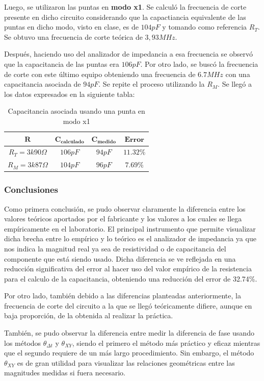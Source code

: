 \documentclass[11pt, a4paper]{article}
\begin{document}
Luego, se utilizaron las puntas en \textbf{modo x1}. Se calculó la frecuencia de corte presente en dicho circuito considerando que la capactiancia equivalente de las puntas en dicho modo, visto en clase, es de $104pF$ y tomando como referencia $R_T$. Se obtuvo una frecuencia de corte teórica de $3,93MHz$. \par Después, haciendo uso del analizador de impedancia a esa frecuencia se observó que la capacitancia de las puntas era $106pF$. Por otro lado, se buscó la frecuencia de corte con este último equipo obteniendo una frecuencia de $6.7MHz$ con una capacitancia asociada de $94pF$. Se repite el proceso utilizando la $R_M$. Se llegó a los datos expresados en la siguiente tabla:
 \begin{center}
     \begin{table}[ht]
     \centering
	 \renewcommand{\arraystretch}{1.1}
         \begin{tabular}{ c c c c}
            \hline 
             $\bm{R}$ &  $\bm{C_{calculado}}$ &    $\bm{C_{medido}}$   &  $\bm{Error}$\\ \hline
             $R_T = 3k90\Omega$  & $106 pF$ & $94 pF$ & $11.32\%$ \\  
             $R_M = 3k87\Omega$ & $104 pF$ & $96p F$ & $7.69 \%$ \\   \hline
        \end{tabular}
        \caption{Capacitancia asociada usando una punta en modo x1}
        \label{table:valores_punta_x1}
    \end{table}
\end{center}


\subsubsection*{Conclusiones}
Como primera conclusión, se pudo observar claramente la diferencia entre los valores teóricos aportados por el fabricante y los valores a los cuales se llega empíricamente en el laboratorio. El principal instrumento que permite visualizar dicha brecha entre lo empírico y lo teórico es el analizador de impedancia ya que nos indica la magnitud real ya sea de resistividad o de capacitancia del componente que está siendo usado. Dicha diferencia se ve reflejada en una reducción significativa del error al hacer uso del valor empírico de la resistencia para el calculo de la capacitancia, obteniendo una reducción del error de 32.74\%. \par
Por otro lado, también debido a las diferencias planteadas anteriormente, la frecuencia de corte del circuito a la que se llegó teóricamente difiere, aunque en baja proporción, de la obtenida al realizar la práctica. 
\par
También, se pudo observar la diferencia entre medir la diferencia de fase usando los métodos $\theta_{\Delta t}$ y $\theta_{XY}$, siendo el primero el método más práctico y eficaz mientras que el segundo requiere de un más largo procedimiento. Sin embargo, el método $\theta_{XY}$ es de gran utilidad para visualizar las relaciones geométricas entre las magnitudes medidas si fuera necesario.
\par
\end{document}
